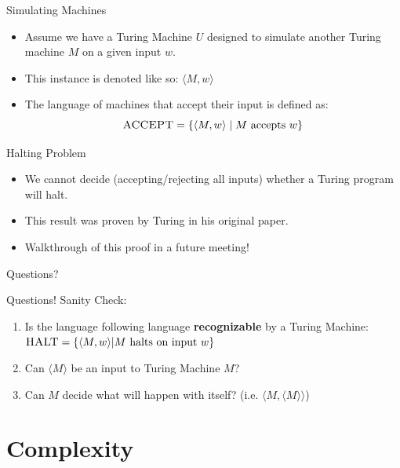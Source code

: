 \documentclass[aspectratio=169, handout]{beamer}
\newcommand{\inst}[1]{\langle #1 \rangle}
\begin{document}
\begin{frame}{Simulating Machines}
\begin{itemize}
    \item Assume we have a Turing Machine $U$ designed to simulate another Turing machine $M$ on a given input $w$. \pause
    \item This instance is denoted like so: $\inst{M, w}$ \pause
    \item The language of machines that accept their input is defined as:
    $$ \textsc{ACCEPT} = \{\inst{M, w} \mid M \ \text{accepts}\ w\} $$
\end{itemize}
\end{frame}

\begin{frame}{Halting Problem}
    \begin{itemize}
        \item We cannot decide (accepting/rejecting all inputs) whether a Turing program will halt.
        \item This result was proven by Turing in his original paper. \pause
        \item Walkthrough of this proof in a future meeting!
    \end{itemize}
\end{frame}

\begin{frame}{}
    \begin{center}
        {\color{sigma@mainblue} \LARGE Questions?}
    \end{center}
\end{frame}

\begin{frame}{Questions!}
Sanity Check:
\begin{enumerate}
    \item Is the language following language \textbf{recognizable} by a Turing Machine: $\textsc{HALT} = \{ \inst{M, w} | M \text{ halts on input } w\}$ 
    \item Can $\inst{M}$ be an input to Turing Machine $M$?
    \item Can $M$ decide what will happen with itself? (i.e. $\inst{M,\inst{M}}$)
\end{enumerate}
\end{frame}

\section{Complexity}
\frame{\sectionpage}
\end{document}
